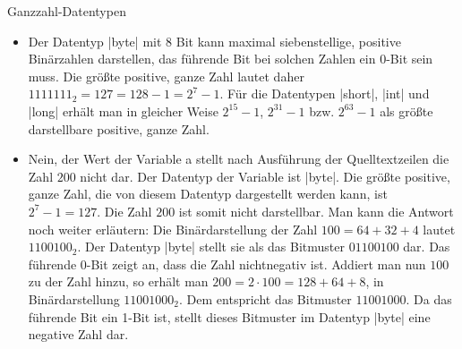 \begin{exercise}{Ganzzahl-Datentypen}
\begin{solution}
\begin{itemize}
\item
Der Datentyp \code|byte| mit 8 Bit kann maximal siebenstellige, positive Binärzahlen darstellen,
das führende Bit bei solchen Zahlen ein 0-Bit sein muss. Die größte positive, ganze Zahl
lautet daher $1111111_2 = 127 = 128 - 1 = 2^7 - 1$. Für die Datentypen \code|short|, \code|int| und \code|long|
erhält man in gleicher Weise $2^{15} - 1$, $2^{31} - 1$ bzw. $2^{63} - 1$ als größte darstellbare positive,
ganze Zahl.

\item
Nein, der Wert der Variable a stellt nach Ausführung der Quelltextzeilen die Zahl $200$ nicht
dar. Der Datentyp der Variable ist \code|byte|. Die größte positive, ganze Zahl, die von diesem
Datentyp dargestellt werden kann, ist $2^7 - 1 = 127$. Die Zahl $200$ ist somit nicht darstellbar.
Man kann die Antwort noch weiter erläutern: Die Binärdarstellung der Zahl $100 = 64 +
32 + 4$ lautet $1100100_2$. Der Datentyp \code|byte| stellt sie als das Bitmuster $01100100$ dar. Das
führende 0-Bit zeigt an, dass die Zahl nichtnegativ ist. Addiert man nun $100$ zu der Zahl
hinzu, so erhält man $200 = 2 \cdot 100 = 128 + 64 + 8$, in Binärdarstellung $11001000_2$. Dem
entspricht das Bitmuster $11001000$. Da das führende Bit ein 1-Bit ist, stellt dieses Bitmuster
im Datentyp \code|byte| eine negative Zahl dar.


\end{itemize}
\end{solution}
\end{exercise}
